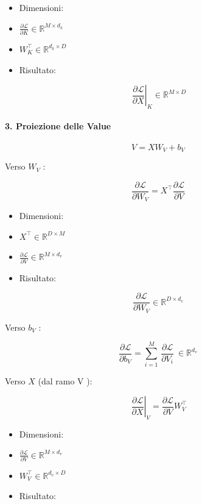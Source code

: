 \documentclass[
  11pt,
]{article}
\begin{document}
\begin{itemize}
\item
  Dimensioni:
\item
  \(\frac{\partial\mathcal{L}}{\partial K} \in \mathbb{R}^{M \times d_{k}}\)
\item
  \(W_{K}^{\top} \in \mathbb{R}^{d_{k} \times D}\)
\item
  Risultato:
\end{itemize}

\[\left. \ \frac{\partial\mathcal{L}}{\partial X} \right|_{K} \in \mathbb{R}^{M \times D}\]

\paragraph{3. Proiezione delle Value}

\[V = XW_{V} + b_{V}\]

Verso \(W_{V}\) :

\[\frac{\partial\mathcal{L}}{\partial W_{V}} = X^{\top}\frac{\partial\mathcal{L}}{\partial V}\]

\begin{itemize}
\item
  Dimensioni:
\item
  \(X^{\top} \in \mathbb{R}^{D \times M}\)
\item
  \(\frac{\partial\mathcal{L}}{\partial V} \in \mathbb{R}^{M \times d_{v}}\)
\item
  Risultato:
\end{itemize}

\[\frac{\partial\mathcal{L}}{\partial W_{V}} \in \mathbb{R}^{D \times d_{v}}\]

Verso \(b_{V}\) :

\[\frac{\partial\mathcal{L}}{\partial b_{V}} = \sum_{i = 1}^{M}\,\frac{\partial\mathcal{L}}{\partial V_{i}}\  \in \mathbb{R}^{d_{v}}\]

Verso \(X\) (dal ramo V ):

\[\left. \ \frac{\partial\mathcal{L}}{\partial X} \right|_{V} = \frac{\partial\mathcal{L}}{\partial V}W_{V}^{\top}\]

\begin{itemize}
\item
  Dimensioni:
\item
  \(\frac{\partial\mathcal{L}}{\partial V} \in \mathbb{R}^{M \times d_{v}}\)
\item
  \(W_{V}^{\top} \in \mathbb{R}^{d_{v} \times D}\)
\item
  Risultato:
\end{itemize}
\end{document}
